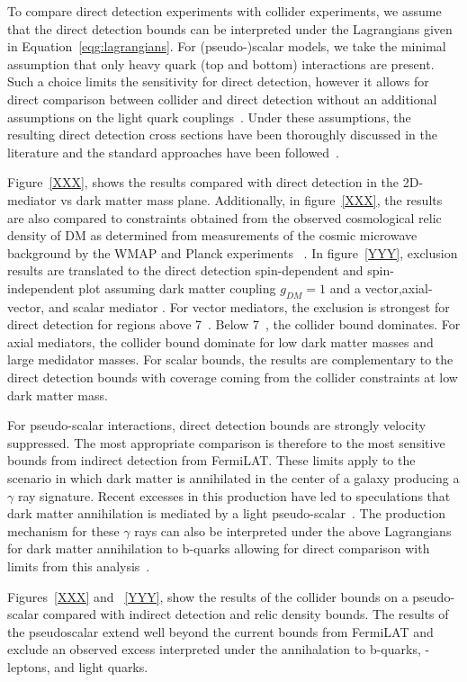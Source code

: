 To compare direct detection experiments with collider experiments, we assume that the direct detection bounds can be interpreted under the Lagrangians given in Equation~\ref{eqg:lagrangians}. 
For (pseudo-)scalar models, we take the minimal assumption that only heavy quark (top and bottom) interactions are present. Such a choice limits the sensitivity for direct 
detection, however it allows for direct comparison between collider and direct detection without an additional assumptions on the light quark couplings~\cite{newpaper}. 
Under these assumptions, the resulting direct detection cross sections have been thoroughly discussed in the literature and the standard approaches have been followed~\cite{atruckload}. 

Figure~\ref{XXX}, shows the results compared with direct detection in the 2D-mediator vs dark matter mass plane. Additionally, in figure~\ref{XXX}, the results are also compared to constraints obtained from the observed cosmological relic density of DM as determined from  measurements of the cosmic microwave background by the WMAP and Planck experiments~\cite{Bennett:2003ba,Planck:2006aa} . In figure~\ref{YYY}, exclusion results are translated to the direct detection spin-dependent and spin-independent plot assuming dark matter coupling $g_{DM}=1$ and a vector,axial-vector, and scalar mediator . For vector mediators, the exclusion is strongest for direct detection for regions above 7~\GeV. Below 7~\GeV, the collider bound dominates. For axial mediators, the collider bound dominate for low dark matter masses and large medidator masses. For scalar bounds, the results are complementary to the direct detection bounds with coverage coming from the collider constraints at low dark matter mass. 

For pseudo-scalar interactions, direct detection bounds are strongly velocity suppressed. The most appropriate comparison is therefore to the most sensitive 
bounds from indirect detection from FermiLAT. These limits apply to the scenario in which dark matter is annihilated in the center of a galaxy producing a $\gamma$ ray signature. 
Recent excesses in this production have led to speculations that dark matter annihilation is mediated by a light pseudo-scalar~\cite{anothertuckload}. 
The production mechanism for these $\gamma$ rays can also be interpreted under the above Lagrangians for dark matter annihilation to b-quarks allowing for direct 
comparison with limits from this analysis~\cite{philnote,buckley,ob}. 

Figures~\ref{XXX} and ~\ref{YYY}, show the results of the collider bounds on a pseudo-scalar compared with indirect detection and relic density bounds. The results of the pseudoscalar extend well beyond the current bounds from FermiLAT and exclude an observed excess interpreted under the annihalation to b-quarks, \tau-leptons, and light quarks.   

